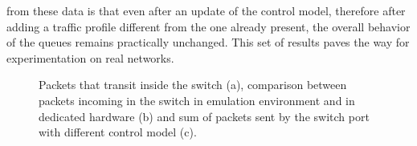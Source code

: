 from these data is that even after an update of the control model, therefore after adding a traffic profile different from the one already present, the overall behavior of the queues remains practically unchanged. This set of results paves the way for experimentation on real networks.
\begin{figure}[H]
\centering
{}
\caption{Packets that transit inside the switch (a), comparison between packets incoming in the switch in emulation environment and in dedicated hardware (b) and sum of packets sent by the switch port with different control model (c).}
\label{fig:PKTS_REAL}
\end{figure}
\
